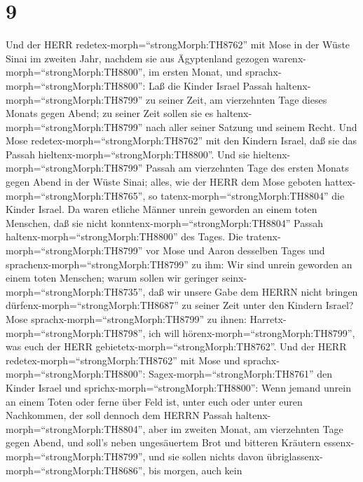 \hypertarget{section-8}{%
\section{9}\label{section-8}}

 Und der HERR redetex-morph=``strongMorph:TH8762'' mit Mose
in der Wüste Sinai im zweiten Jahr, nachdem sie aus Ägyptenland gezogen
warenx-morph=``strongMorph:TH8800'', im ersten Monat, und
sprachx-morph=``strongMorph:TH8800'':  Laß die Kinder Israel
Passah haltenx-morph=``strongMorph:TH8799'' zu seiner Zeit, 
am vierzehnten Tage dieses Monats gegen Abend; zu seiner Zeit sollen sie
es haltenx-morph=``strongMorph:TH8799'' nach aller seiner Satzung und
seinem Recht.  Und Mose redetex-morph=``strongMorph:TH8762''
mit den Kindern Israel, daß sie das Passah
hieltenx-morph=``strongMorph:TH8800''.  Und sie
hieltenx-morph=``strongMorph:TH8799'' Passah am vierzehnten Tage des
ersten Monats gegen Abend in der Wüste Sinai; alles, wie der HERR dem
Mose geboten hattex-morph=``strongMorph:TH8765'', so
tatenx-morph=``strongMorph:TH8804'' die Kinder Israel.  Da
waren etliche Männer unrein geworden an einem toten Menschen, daß sie
nicht konntenx-morph=``strongMorph:TH8804'' Passah
haltenx-morph=``strongMorph:TH8800'' des Tages. Die
tratenx-morph=``strongMorph:TH8799'' vor Mose und Aaron desselben Tages
 und sprachenx-morph=``strongMorph:TH8799'' zu ihm: Wir sind
unrein geworden an einem toten Menschen; warum sollen wir geringer
seinx-morph=``strongMorph:TH8735'', daß wir unsere Gabe dem HERRN nicht
bringen dürfenx-morph=``strongMorph:TH8687'' zu seiner Zeit unter den
Kindern Israel?  Mose sprachx-morph=``strongMorph:TH8799''
zu ihnen: Harretx-morph=``strongMorph:TH8798'', ich will
hörenx-morph=``strongMorph:TH8799'', was euch der HERR
gebietetx-morph=``strongMorph:TH8762''.  Und der HERR
redetex-morph=``strongMorph:TH8762'' mit Mose und
sprachx-morph=``strongMorph:TH8800'': 
Sagex-morph=``strongMorph:TH8761'' den Kinder Israel und
sprichx-morph=``strongMorph:TH8800'': Wenn jemand unrein an einem Toten
oder ferne über Feld ist, unter euch oder unter euren Nachkommen, der
soll dennoch dem HERRN Passah haltenx-morph=``strongMorph:TH8804'',
 aber im zweiten Monat, am vierzehnten Tage gegen Abend,
und soll's neben ungesäuertem Brot und bitteren Kräutern
essenx-morph=``strongMorph:TH8799'',  und sie sollen nichts
davon übriglassenx-morph=``strongMorph:TH8686'', bis morgen, auch kein
